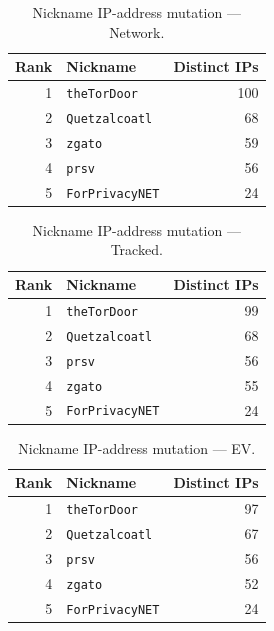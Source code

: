 \documentclass[conference]{IEEEtran}
\begin{document}
\begin{table}[H]
\caption{Nickname IP-address mutation --- Network.}
\begin{center}\small
\begin{tabular}{|r|l|r|}
\hline
\textbf{Rank} & \textbf{Nickname} & \textbf{Distinct IPs} \\ \hline
1 & \texttt{theTorDoor} & 100 \\ \hline
2 & \texttt{Quetzalcoatl} & 68 \\ \hline
3 & \texttt{zgato} & 59 \\ \hline
4 & \texttt{prsv} & 56 \\ \hline
5 & \texttt{ForPrivacyNET} & 24 \\ \hline
\end{tabular}
\label{tab:ipchg_network}
\end{center}\end{table}
 
\begin{table}[H]
\caption{Nickname IP-address mutation --- Tracked.}
\begin{center}\small
\begin{tabular}{|r|l|r|}
\hline
\textbf{Rank} & \textbf{Nickname} & \textbf{Distinct IPs} \\ \hline
1 & \texttt{theTorDoor} & 99 \\ \hline
2 & \texttt{Quetzalcoatl} & 68 \\ \hline
3 & \texttt{prsv} & 56 \\ \hline
4 & \texttt{zgato} & 55 \\ \hline
5 & \texttt{ForPrivacyNET} & 24 \\ \hline
\end{tabular}
\label{tab:ipchg_tracked}
\end{center}\end{table}
 
\begin{table}[H]
\caption{Nickname IP-address mutation --- EV.}
\begin{center}\small
\begin{tabular}{|r|l|r|}
\hline
\textbf{Rank} & \textbf{Nickname} & \textbf{Distinct IPs} \\ \hline
1 & \texttt{theTorDoor} & 97 \\ \hline
2 & \texttt{Quetzalcoatl} & 67 \\ \hline
3 & \texttt{prsv} & 56 \\ \hline
4 & \texttt{zgato} & 52 \\ \hline
5 & \texttt{ForPrivacyNET} & 24 \\ \hline
\end{tabular}
\label{tab:ipchg_ephemeral_variable}
\end{center}\end{table}
 
\end{document}
